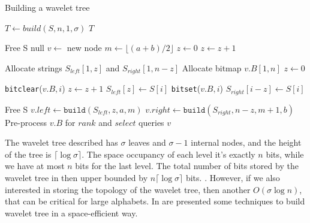\clearpage
\begin{algorithm}[ht!]
    \caption{Building a wavelet tree}\label{alg:build_wt}
    \begin{algorithmic}

        \State $T \gets build(S,n,1,\sigma)$
        \State \Return $T$
        \EndFunction

        \vspace{0.4cm}
         
        \State Free S
        \State \Return null
        \EndIf
        \State $v \gets$ new node
        \State $m \gets \lfloor (a+b)/2 \rfloor$
        \State $z \gets 0$ 
        \State $z \gets z+1$
        \EndIf
        \EndFor

        \State Allocate strings $S_{left}[1,z]$ and $S_{right}[1,n-z]$
        \State Allocate bitmap $v.B[1,n]$
        \State $z \gets 0$

        \State \texttt{bitclear}($v.B,i$) 
        \State $z \gets z+1$
        \State $S_{left}[z] \gets S[i]$
        \Else
        \State \texttt{bitset}($v.B,i$) 
        \State $S_{right}[i-z] \gets S[i]$
        \EndIf
        \EndFor

        \State Free S
        \State $v.left \gets \texttt{build}(S_{left},z,a,m)$
        \State $v.right \gets \texttt{build}(S_{right},n-z,m+1,b)$
        \State Pre-process $v.B$ for $rank$ and $select$ queries
        \State \Return $v$
        \EndFunction
    \end{algorithmic}
\end{algorithm}

\begin{remark} \label{rem:space_occupancy_wavelet_tree}
    The wavelet tree described has $\sigma$ leaves and $\sigma-1$ internal nodes, and the height of the tree is $ \lceil \log \sigma \rceil$. The space occupancy of each level it's exactly $n$ bits, while we have at most $n$ bits for the last level. The total number of bits stored by the wavelet tree in then upper bounded by $n \lceil \log \sigma \rceil$ bits. \cite{WTForALL}. However, if we also interested in storing the topology of the wavelet tree, then another $O(\sigma \log n)$, that can be critical for large alphabets. In \cite{claude2011space,tischler2011wavelet} are presented some techniques to build wavelet tree in a space-efficient way.
\end{remark}

